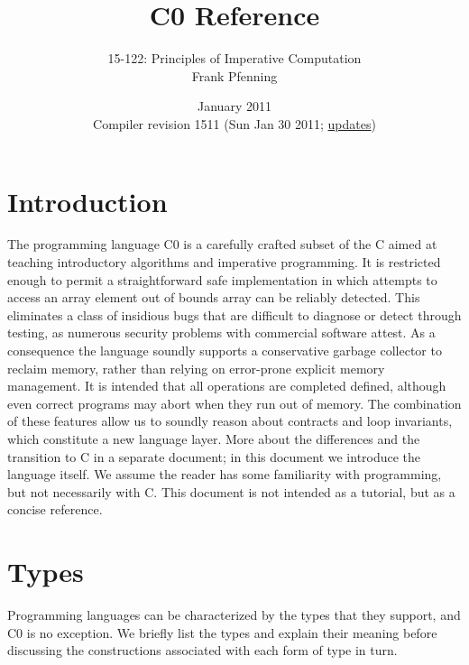 \documentclass[11pt]{article}
\title{C0 Reference}
\author{15-122: Principles of Imperative Computation \\ Frank Pfenning}
\date{January 2011\\Compiler revision 1511 (Sun Jan 30 2011;
  \hyperlink{sec:updates}{updates})}
\begin{document}
\maketitle

\section{Introduction}

The programming language C0 is a carefully crafted subset of the C
aimed at teaching introductory algorithms and imperative programming.
It is restricted enough to permit a straightforward safe
implementation in which attempts to access an array element out of
bounds array can be reliably detected.  This eliminates a class of
insidious bugs that are difficult to diagnose or detect through
testing, as numerous security problems with commercial software
attest.  As a consequence the language soundly supports a conservative
garbage collector to reclaim memory, rather than relying on
error-prone explicit memory management.  It is intended that all
operations are completed defined, although even correct programs may
abort when they run out of memory.  The combination of these features
allow us to soundly reason about contracts and loop invariants, which
constitute a new language layer.  More about the differences and the
transition to C in a separate document; in this document we introduce
the language itself.  We assume the reader has some familiarity with
programming, but not necessarily with C\@.  This document is not intended
as a tutorial, but as a concise reference.

\section{Types}

Programming languages can be characterized by the types that they support,
and C0 is no exception.  We briefly list the types and explain their
meaning before discussing the constructions associated with each
form of type in turn.
\end{document}

